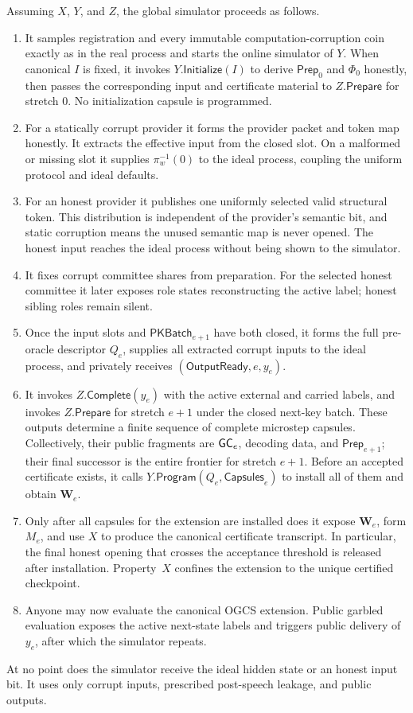Assuming $X$, $Y$, and $Z$, the global simulator proceeds as follows.
\begin{enumerate}
  \item It samples registration and every immutable computation-corruption
    coin exactly as in the real process and starts the online simulator of
    $Y$.  When canonical $I$ is fixed, it invokes $Y.\mathsf{Initialize}(I)$
    to derive $\mathsf{Prep}_0$ and $\Phi_0$ honestly, then passes the
    corresponding input and certificate material to $Z.\mathsf{Prepare}$ for
    stretch $0$.  No initialization capsule is programmed.
  \item For a statically corrupt provider it forms the provider packet and
    token map honestly.  It extracts the effective input from the closed slot.
    On a malformed or missing slot it supplies $\pi_w^{-1}(0)$ to the ideal
    process, coupling the uniform protocol and ideal defaults.
  \item For an honest provider it publishes one uniformly selected valid
    structural token.  This distribution is independent of the provider's
    semantic bit, and static corruption means the unused semantic map is never
    opened.  The honest input reaches the ideal process without being shown to
    the simulator.
  \item It fixes corrupt committee shares from preparation.  For the selected
    honest committee it later exposes role states reconstructing the active
    label; honest sibling roles remain silent.
  \item Once the input slots and $\mathsf{PKBatch}_{e+1}$ have both closed,
    it forms the full pre-oracle descriptor $Q_e$, supplies all extracted
    corrupt inputs to the ideal process, and privately receives
    $(\mathsf{OutputReady},e,y_e)$.
  \item It invokes $Z.\mathsf{Complete}(y_e)$ with the active external and
    carried labels, and invokes $Z.\mathsf{Prepare}$ for stretch $e+1$ under
    the closed next-key batch.  These outputs determine a finite sequence of
    complete microstep capsules.  Collectively, their public fragments are
    $\mathsf{GC}_e$, decoding data, and $\mathsf{Prep}_{e+1}$; their final successor is
    the entire frontier for stretch $e+1$.  Before an accepted certificate
    exists, it calls
    $Y.\mathsf{Program}(Q_e,\mathsf{Capsules}_e)$ to install all of them and
    obtain $\mathbf W_e$.
  \item Only after all capsules for the extension are installed does it expose
    $\mathbf W_e$,
    form $M_e$, and use $X$ to produce the canonical certificate transcript.
    In particular, the final honest opening that crosses the acceptance
    threshold is released after installation.  Property~$X$ confines the
    extension to the unique certified checkpoint.
  \item Anyone may now evaluate the canonical OGCS extension.  Public garbled
    evaluation exposes the active next-state labels and triggers public
    delivery of $y_e$, after which the simulator repeats.
\end{enumerate}
At no point does the simulator receive the ideal hidden state or an honest
input bit.  It uses only corrupt inputs, prescribed post-speech leakage, and
public outputs.

